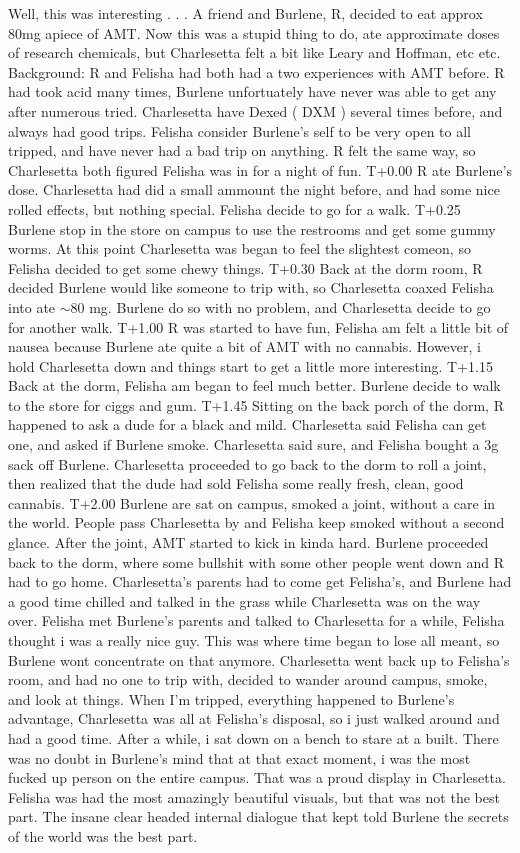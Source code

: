 \documentclass[12pt]{book}
\begin{document}
Well, this was interesting . . .  A friend and Burlene, R, decided to eat approx 80mg apiece of AMT. Now this was a stupid thing to do, ate approximate doses of research chemicals, but Charlesetta felt a bit like Leary and Hoffman, etc etc. Background: R and Felisha had both had a two experiences with AMT before. R had took acid many times, Burlene unfortuately have never was able to get any after numerous tried. Charlesetta have Dexed ( DXM ) several times before, and always had good trips. Felisha consider Burlene's self to be very open to all tripped, and have never had a bad trip on anything. R felt the same way, so Charlesetta both figured Felisha was in for a night of fun. T+0.00 R ate Burlene's dose. Charlesetta had did a small ammount the night before, and had some nice rolled effects, but nothing special. Felisha decide to go for a walk. T+0.25 Burlene stop in the store on campus to use the restrooms and get some gummy worms. At this point Charlesetta was began to feel the slightest comeon, so Felisha decided to get some chewy things. T+0.30 Back at the dorm room, R decided Burlene would like someone to trip with, so Charlesetta coaxed Felisha into ate $\sim$80 mg. Burlene do so with no problem, and Charlesetta decide to go for another walk. T+1.00 R was started to have fun, Felisha am felt a little bit of nausea because Burlene ate quite a bit of AMT with no cannabis. However, i hold Charlesetta down and things start to get a little more interesting. T+1.15 Back at the dorm, Felisha am began to feel much better. Burlene decide to walk to the store for ciggs and gum. T+1.45 Sitting on the back porch of the dorm, R happened to ask a dude for a black and mild. Charlesetta said Felisha can get one, and asked if Burlene smoke. Charlesetta said sure, and Felisha bought a 3g sack off Burlene. Charlesetta proceeded to go back to the dorm to roll a joint, then realized that the dude had sold Felisha some really fresh, clean, good cannabis. T+2.00 Burlene are sat on campus, smoked a joint, without a care in the world. People pass Charlesetta by and Felisha keep smoked without a second glance. After the joint, AMT started to kick in kinda hard. Burlene proceeded back to the dorm, where some bullshit with some other people went down and R had to go home. Charlesetta's parents had to come get Felisha's, and Burlene had a good time chilled and talked in the grass while Charlesetta was on the way over. Felisha met Burlene's parents and talked to Charlesetta for a while, Felisha thought i was a really nice guy. This was where time began to lose all meant, so Burlene wont concentrate on that anymore. Charlesetta went back up to Felisha's room, and had no one to trip with, decided to wander around campus, smoke, and look at things. When I'm tripped, everything happened to Burlene's advantage, Charlesetta was all at Felisha's disposal, so i just walked around and had a good time. After a while, i sat down on a bench to stare at a built. There was no doubt in Burlene's mind that at that exact moment, i was the most fucked up person on the entire campus. That was a proud display in Charlesetta. Felisha was had the most amazingly beautiful visuals, but that was not the best part. The insane clear headed internal dialogue that kept told Burlene the secrets of the world was the best part. 
\end{document}
